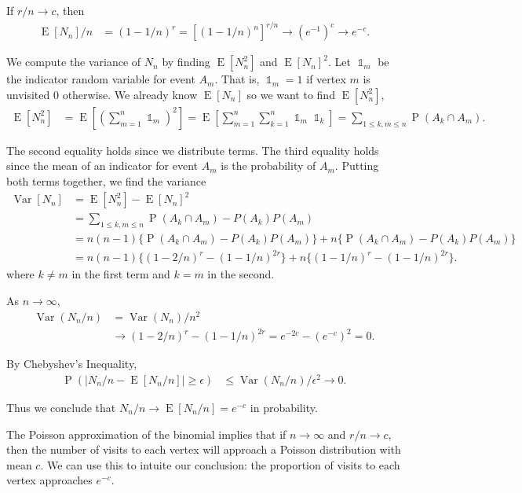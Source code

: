 \documentclass[12pt]{article}
\theoremstyle{definition}
\DeclareMathOperator{\E}{\mathrm{E}}		     %
\DeclareMathOperator{\Var}{\mathrm{Var}}         %
\DeclareMathOperator{\I}{\mathbb{1}}         %
\DeclareMathOperator{\pr}{\mathrm{P}}		     %
\begin{document}
If $r/n \rightarrow c$, then
\begin{align}
\E[N_n]/n &= (1-1/n)^r = [(1-1/n)^n]^{r/n} \rightarrow (e^{-1})^c
\rightarrow e^{-c}. \nonumber
\end{align}

We compute the variance of $N_n$ by finding $\E[N_n^2]$ and $\E[N_n]^2$.
Let $\I_m$ be the indicator random variable for event $A_m$.
That is, $\I_m = 1$ if vertex $m$ is unvisited 0 otherwise.
We already know $\E[N_n]$ so we want to find $\E[N_n^2]$,
\begin{align}
\E[N_n^2] &= \E \left[ \left(\sum_{m=1}^n \I_m \right) ^2 \right] =
\E \left[ \sum_{m=1}^n \sum_{k=1}^n \I_m \I_k \right] =
\sum_{1 \leq k, m \leq n} \pr(A_k \cap A_m). \nonumber
\end{align}

The second equality holds since we distribute terms.
The third equality holds since the mean of an indicator for event $A_m$
is the probability of $A_m$.
Putting both terms together, we find the variance
\begin{align}
\Var[N_n] &= \E[N_n^2] - \E[N_n]^2 \nonumber \\
&= \sum_{1 \leq k, m \leq n} \pr(A_k \cap A_m) - P(A_k)P(A_m) \nonumber \\
&= n(n-1) \{ \pr(A_k \cap A_m) - P(A_k)P(A_m) \} + 
n \{ \pr(A_k \cap A_m) - P(A_k)P(A_m) \} \nonumber \\
&= n(n-1) \{ (1-2/n)^r - (1-1/n)^{2r} \} + 
n \{ (1-1/n)^r  - (1-1/n)^{2r} \}. \nonumber
\end{align}
where $k\neq m$ in the first term and $k=m$ in the second.

As $n \rightarrow \infty$,
\begin{align}
\Var(N_n/n) &= \Var(N_n) / n^2 \nonumber\\
&\rightarrow (1-2/n)^r - (1-1/n)^{2r} = e^{-2c} - (e^{-c})^2 = 0. \nonumber
\end{align}

By Chebyshev's Inequality,
\begin{align}
\pr \left( |N_n/n - \E[N_n/n]| \geq \epsilon \right) &\leq \Var(N_n/n) / \epsilon^2
\rightarrow 0. \nonumber
\end{align}

Thus we conclude that $N_n/n \rightarrow \E[N_n/n] = e^{-c}$ in probability. 

The Poisson approximation of the binomial implies that if $n \rightarrow \infty$
and $r/n \rightarrow c$, then the number of visits to each vertex will approach
a Poisson distribution with mean $c$.
We can use this to intuite our conclusion: the proportion of visits to each vertex
approaches $e^{-c}$.
\end{document}
